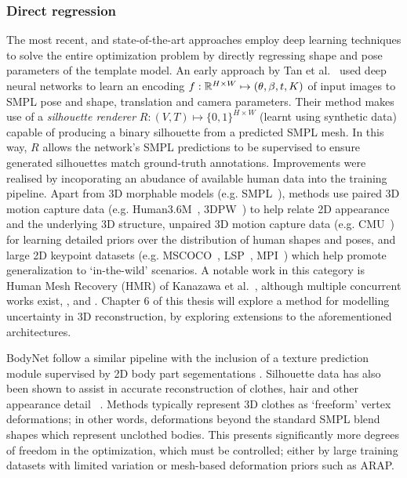     \subsubsection{Direct regression}
    The most recent, and state-of-the-art approaches employ deep learning techniques to solve the entire optimization problem by directly regressing shape and pose parameters of the template model. An early approach by Tan et al.~\cite{tan17indirect} used deep neural networks to learn an encoding $f: {\mathbb{R}^{H \times W}} \mapsto (\theta, \beta, t, K)$ of input images to SMPL pose and shape, translation and camera parameters. Their method makes use of a \emph{silhouette renderer} $R : (V, T) \mapsto \{0,1\}^{H \times W}$ (learnt using synthetic data) capable of producing a binary silhouette from a predicted SMPL mesh. In this way, $R$ allows the network's SMPL predictions to be supervised to ensure generated silhouettes match ground-truth annotations. 
    Improvements were realised by incoporating an abudance of available human data into the training pipeline. Apart from 3D morphable models (e.g. SMPL~\cite{loper15smpl}), methods use paired 3D motion capture data (e.g. Human3.6M~\cite{ionescu2013human3,IonescuSminchisescu11}, 3DPW~\cite{vonmarcard2018recovering}) to help relate 2D appearance and the underlying 3D structure, unpaired 3D motion capture data (e.g. CMU~) for learning detailed priors over the distribution of human shapes and poses, and large 2D keypoint datasets (e.g. MSCOCO~, LSP~, MPI~) which help promote generalization to `in-the-wild' scenarios. A notable work in this category is Human Mesh Recovery (HMR) of Kanazawa et al.~\cite{kanazawa18end-to-end}, although multiple concurrent works exist, ,  and . Chapter 6 of this thesis will explore a method for modelling uncertainty in 3D reconstruction, by exploring extensions to the aforementioned architectures.

    
    BodyNet  follow a similar pipeline with the inclusion of a texture prediction module supervised by 2D body part segementations . Silhouette data has also been shown to assist in accurate reconstruction of clothes, hair and other appearance detail~\cite{alldieck2019learning}  . Methods typically represent 3D clothes as `freeform' vertex deformations; in other words, deformations beyond the standard SMPL blend shapes which represent unclothed bodies. This presents significantly more degrees of freedom in the optimization, which must be controlled; either by large training datasets with limited variation or mesh-based deformation priors such as ARAP. 

